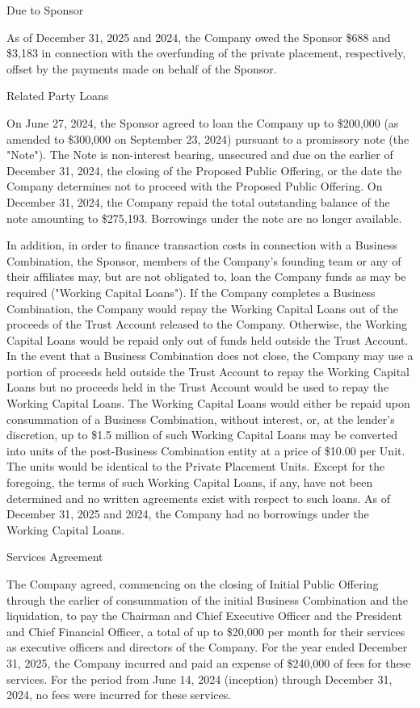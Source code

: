 \documentclass[11pt,a4paper]{article}
\begin{document}
Due to Sponsor

As of December 31, 2025 and 2024, the Company owed the Sponsor \$688 and \$3,183 in connection with the overfunding of the private placement, respectively, offset by the payments made on behalf of the Sponsor.

Related Party Loans

On June 27, 2024, the Sponsor agreed to loan the Company up to \$200,000 (as amended to \$300,000 on September 23, 2024) pursuant to a promissory note (the "Note"). The Note is non-interest bearing, unsecured and due on the earlier of December 31, 2024, the closing of the Proposed Public Offering, or the date the Company determines not to proceed with the Proposed Public Offering. On December 31, 2024, the Company repaid the total outstanding balance of the note amounting to \$275,193. Borrowings under the note are no longer available.

In addition, in order to finance transaction costs in connection with a Business Combination, the Sponsor, members of the Company's founding team or any of their affiliates may, but are not obligated to, loan the Company funds as may be required ("Working Capital Loans"). If the Company completes a Business Combination, the Company would repay the Working Capital Loans out of the proceeds of the Trust Account released to the Company. Otherwise, the Working Capital Loans would be repaid only out of funds held outside the Trust Account. In the event that a Business Combination does not close, the Company may use a portion of proceeds held outside the Trust Account to repay the Working Capital Loans but no proceeds held in the Trust Account would be used to repay the Working Capital Loans. The Working Capital Loans would either be repaid upon consummation of a Business Combination, without interest, or, at the lender's discretion, up to \$1.5 million of such Working Capital Loans may be converted into units of the post-Business Combination entity at a price of \$10.00 per Unit. The units would be identical to the Private Placement Units. Except for the foregoing, the terms of such Working Capital Loans, if any, have not been determined and no written agreements exist with respect to such loans. As of December 31, 2025 and 2024, the Company had no borrowings under the Working Capital Loans.

Services Agreement

The Company agreed, commencing on the closing of Initial Public Offering through the earlier of consummation of the initial Business Combination and the liquidation, to pay the Chairman and Chief Executive Officer and the President and Chief Financial Officer, a total of up to \$20,000 per month for their services as executive officers and directors of the Company. For the year ended December 31, 2025, the Company incurred and paid an expense of \$240,000 of fees for these services. For the period from June 14, 2024 (inception) through December 31, 2024, no fees were incurred for these services.
\end{document}
